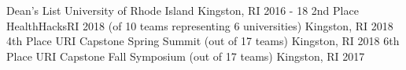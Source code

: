  \begin{cvhonors}
  \cvhonor
    {Dean's List}
    {University of Rhode Island}
    {Kingston, RI}
    {2016 - 18}
  \cvhonor
    {2nd Place}
    {HealthHacksRI 2018 (of 10 teams representing 6 universities)}
    {Kingston, RI}
    {2018}
  \cvhonor
    {4th Place}
    {URI Capstone Spring Summit (out of 17 teams)}
    {Kingston, RI}
    {2018}
  \cvhonor
    {6th Place}
    {URI Capstone Fall Symposium (out of 17 teams)}
    {Kingston, RI}
    {2017}
\end{cvhonors}
